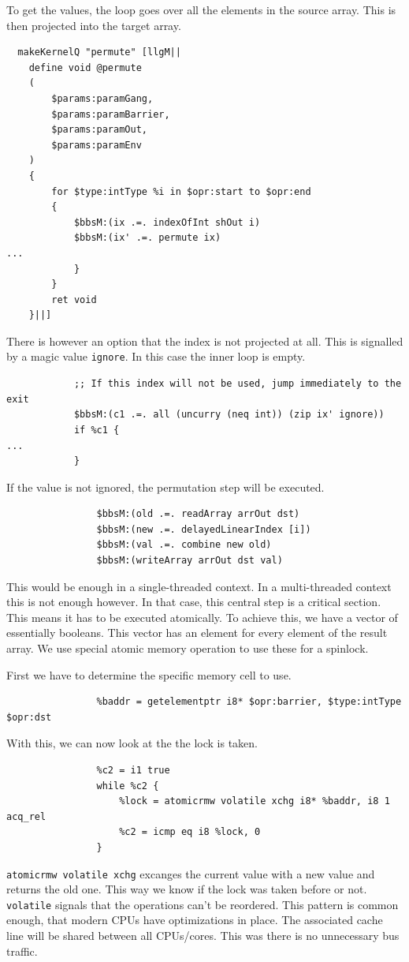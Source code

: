 \documentclass[a4paper,bibliography=totocnumbered,parskip,headsepline]{scrbook}
\begin{document}
To get the values, the loop goes over all the elements in the source array.
This is then projected into the target array.
\begin{lstlisting}
  makeKernelQ "permute" [llgM||
    define void @permute
    (
        $params:paramGang,
        $params:paramBarrier,
        $params:paramOut,
        $params:paramEnv
    )
    {
        for $type:intType %i in $opr:start to $opr:end
        {
            $bbsM:(ix .=. indexOfInt shOut i)
            $bbsM:(ix' .=. permute ix)
...
            }
        }
        ret void
    }||]
\end{lstlisting}
There is however an option that the index is not projected at all.
This is signalled by a magic value \lstinline[language=haskell]!ignore!.
In this case the inner loop is empty.
\begin{lstlisting}
            ;; If this index will not be used, jump immediately to the exit
            $bbsM:(c1 .=. all (uncurry (neq int)) (zip ix' ignore))
            if %c1 {
...
            }
\end{lstlisting}
If the value is not ignored, the permutation step will be executed.
\begin{lstlisting}
                $bbsM:(old .=. readArray arrOut dst)
                $bbsM:(new .=. delayedLinearIndex [i])
                $bbsM:(val .=. combine new old)
                $bbsM:(writeArray arrOut dst val)
\end{lstlisting}
This would be enough in a single-threaded context.
In a multi-threaded context this is not enough however.
In that case, this central step is a critical section.
This means it has to be executed atomically.
To achieve this, we have a vector of essentially booleans.
This vector has an element for every element of the result array.
We use special atomic memory operation to use these for a spinlock.

First we have to determine the specific memory cell to use.
\begin{lstlisting}
                %baddr = getelementptr i8* $opr:barrier, $type:intType $opr:dst
\end{lstlisting}
With this, we can now look at the the lock is taken.
\begin{lstlisting}
                %c2 = i1 true
                while %c2 {
                    %lock = atomicrmw volatile xchg i8* %baddr, i8 1 acq_rel
                    %c2 = icmp eq i8 %lock, 0
                }
\end{lstlisting}
\lstinline!atomicrmw volatile xchg! excanges the current value with a new value and returns the old one.
This way we know if the lock was taken before or not.
\lstinline!volatile! signals that the operations can't be reordered.
This pattern is common enough, that modern CPUs have optimizations in place.
The associated cache line will be shared between all CPUs/cores.
This was there is no unnecessary bus traffic.
\end{document}
